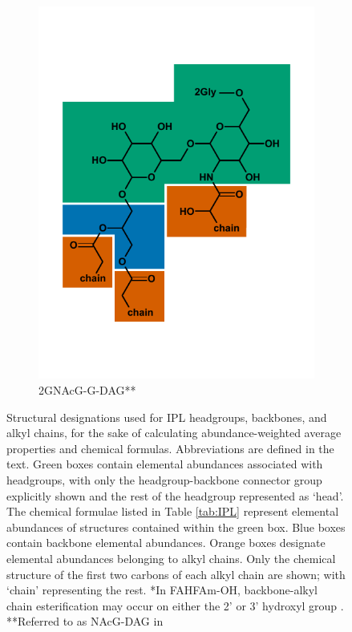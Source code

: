 {\begin{figure}[h]
\begin{subfigure}[b]{.3\linewidth}
        \includegraphics[width=\linewidth]{figs_ch1/2GNAcG-G-DAG}
    	\caption{2GNAcG-G-DAG**}
        \label{fig:2GNAcG-G-DAG}
    \end{subfigure}

    
\caption[Structural designations used for IPL headgroups, backbones, and alkyl chains]{Structural designations used for IPL headgroups, backbones, and alkyl chains, for the sake of calculating abundance-weighted average properties and chemical formulas. Abbreviations are defined in the text. Green boxes contain elemental abundances associated with headgroups, with only the headgroup-backbone connector group explicitly shown and the rest of the headgroup represented as `head'. The chemical formulae listed in Table \ref{tab:IPL} represent elemental abundances of structures contained within the green box. Blue boxes contain backbone elemental abundances. Orange boxes designate elemental abundances belonging to alkyl chains. Only the chemical structure of the first two carbons of each alkyl chain are shown; with `chain' representing the rest. *In FAHFAm-OH, backbone-alkyl chain esterification may occur on either the 2' or 3' hydroxyl group \citep{diercks2015accumulation}. **Referred to as NAcG-DAG in \cite{schubotz2013spatial}}
\label{fig:IPLdivision}
\end{figure}
\doublespace
\clearpage
}


